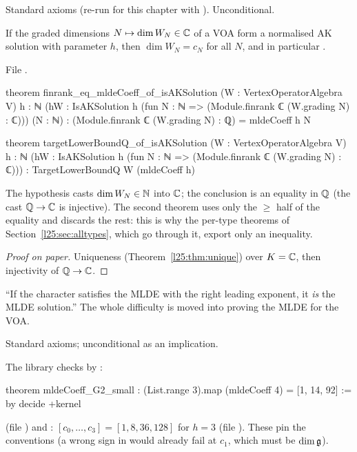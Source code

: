 \begin{status}
Standard axioms (re-run for this chapter with ). Unconditional.
\end{status}

\begin{theorem}\label{l25:thm:fromAK}
If the graded dimensions $N\mapsto\dim W_N\in{\mathbb{C}}$ of a VOA form a normalised AK solution with parameter $h$, then
$\dim W_N=c_N$ for all $N$, and in particular .
\end{theorem}
\noindent File .
\begin{leancode}
theorem finrank_eq_mldeCoeff_of_isAKSolution (W : VertexOperatorAlgebra V) {h : ℕ}
    (hW : IsAKSolution h (fun N : ℕ => (Module.finrank ℂ (W.grading N) : ℂ))) (N : ℕ) :
    (Module.finrank ℂ (W.grading N) : ℚ) = mldeCoeff h N

theorem targetLowerBoundQ_of_isAKSolution (W : VertexOperatorAlgebra V) {h : ℕ}
    (hW : IsAKSolution h (fun N : ℕ => (Module.finrank ℂ (W.grading N) : ℂ))) :
    TargetLowerBoundQ W (mldeCoeff h)
\end{leancode}
\begin{dictionary}
The hypothesis casts $\dim W_N\in{\mathbb{N}}$ into ${\mathbb{C}}$; the conclusion is an equality in ${\mathbb{Q}}$ (the cast ${\mathbb{Q}}\to{\mathbb{C}}$ is
injective). The second theorem uses only the $\ge$ half of the equality and discards the rest: this is why the
per-type theorems of Section~\ref{l25:sec:alltypes}, which go through it, export only an inequality.
\end{dictionary}
\begin{proof}[Proof on paper]
Uniqueness (Theorem~\ref{l25:thm:unique}) over $K={\mathbb{C}}$, then injectivity of ${\mathbb{Q}}\to{\mathbb{C}}$.
\end{proof}
\begin{physics}
``If the character satisfies the MLDE with the right leading exponent, it \emph{is} the MLDE solution.'' The
whole difficulty is moved into proving the MLDE for the VOA.
\end{physics}
\begin{status}
Standard axioms; unconditional as an implication.
\end{status}

\begin{example}\label{l25:ex:small}
The library checks by :
\begin{leancode}
theorem mldeCoeff_G2_small : (List.range 3).map (mldeCoeff 4) = [1, 14, 92] := by decide +kernel
\end{leancode}
\noindent (file ) and
: $[c_0,\dots,c_3]=[1,8,36,128]$ for $h=3$ (file ). These pin
the conventions (a wrong sign in  would already fail at $c_1$, which must be $\dim\mathfrak g$).
\end{example}

